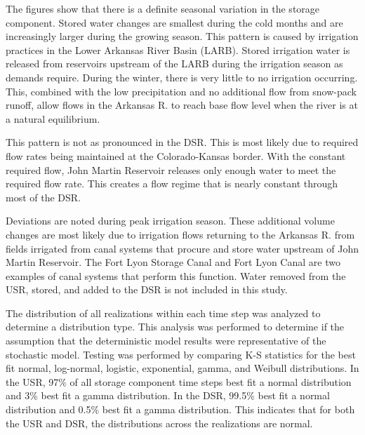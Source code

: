 \begin{linenumbers}
The figures show that there is a definite seasonal variation in the storage component.  Stored water changes are smallest during the cold months and are increasingly larger during the growing season.  This pattern is caused by irrigation practices in the Lower Arkansas River Basin (LARB).  Stored irrigation water is released from reservoirs upstream of the LARB during the irrigation season as demands require.  During the winter, there is very little to no irrigation occurring.  This, combined with the low precipitation and no additional flow from snow-pack runoff, allow flows in the Arkansas R. to reach base flow level when the river is at a natural equilibrium.

This pattern is not as pronounced in the DSR.  This is most likely due to required flow rates being maintained at the Colorado-Kansas border.  With the constant required flow, John Martin Reservoir releases only enough water to meet the required flow rate.  This creates a flow regime that is nearly constant through most of the DSR. 

Deviations are noted during peak irrigation season.  These additional volume changes are most likely due to irrigation flows returning to the Arkansas R. from fields irrigated from canal systems that procure and store water upstream of John Martin Reservoir.  The Fort Lyon Storage Canal and Fort Lyon Canal are two examples of canal systems that perform this function.  Water removed from the USR, stored, and added to the DSR is not included in this study.

The distribution of all realizations within each time step was analyzed to determine a distribution type.  This analysis was performed to determine if the assumption that the deterministic model results were representative of the stochastic model.   Testing was performed by comparing K-S statistics for the best fit normal, log-normal, logistic, exponential, gamma, and Weibull distributions.  In the USR, 97\% of all storage component time steps best fit a normal distribution and 3\% best fit a gamma distribution.  In the DSR, 99.5\% best fit a normal distribution and 0.5\% best fit a gamma distribution.  This indicates that for both the USR and DSR, the distributions across the realizations are normal.


\end{linenumbers}

